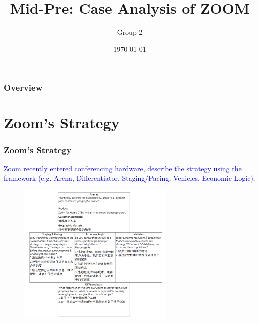 \documentclass{beamer}
\title[Business Strategy]{Mid-Pre: Case Analysis of \textbf{ZOOM}} %
\author{Group 2} %
\institute[ENTR1006,Fall20] %
{
\textit{ZiyeLiu,YuweiMao,ChengShi,BoYang} %
}
\date{\today} %
\begin{document}
\begin{frame}
\titlepage %
\end{frame}

\begin{frame}
\frametitle{Overview} %
\tableofcontents %
\end{frame}


\section{Zoom's Strategy} %




\begin{frame}
\frametitle{Zoom's Strategy}
\textcolor{blue}{Zoom recently entered conferencing hardware, describe the strategy using the framework (e.g. Arena, Differentiator, Staging/Pacing, Vehicles, Economic Logic).}
\begin{figure}[h]
    \includegraphics[width=7.5cm]{pics/q1.png}
\end{figure}
\end{frame}
\end{document}
